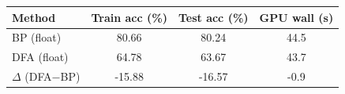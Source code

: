 \begin{tabular}{lccc}
\hline
Method & Train acc (\%) & Test acc (\%) & GPU wall (s) \\
\hline
BP (float) & 80.66 & 80.24 & 44.5 \\
DFA (float) & 64.78 & 63.67 & 43.7 \\
\hline
$\Delta$ (DFA$-$BP) & -15.88 & -16.57 & -0.9 \\
\hline
\end{tabular}

